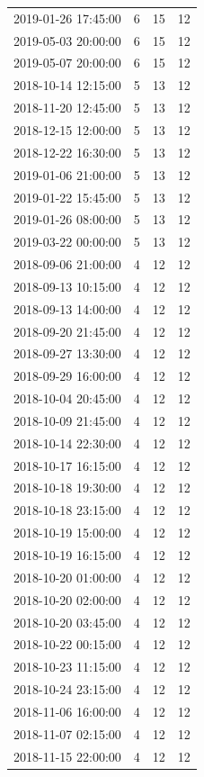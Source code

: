 \begin{tabular}{lrrr}
2019-01-26 17:45:00 & 6 & 15 & 12 \\
2019-05-03 20:00:00 & 6 & 15 & 12 \\
2019-05-07 20:00:00 & 6 & 15 & 12 \\
2018-10-14 12:15:00 & 5 & 13 & 12 \\
2018-11-20 12:45:00 & 5 & 13 & 12 \\
2018-12-15 12:00:00 & 5 & 13 & 12 \\
2018-12-22 16:30:00 & 5 & 13 & 12 \\
2019-01-06 21:00:00 & 5 & 13 & 12 \\
2019-01-22 15:45:00 & 5 & 13 & 12 \\
2019-01-26 08:00:00 & 5 & 13 & 12 \\
2019-03-22 00:00:00 & 5 & 13 & 12 \\
2018-09-06 21:00:00 & 4 & 12 & 12 \\
2018-09-13 10:15:00 & 4 & 12 & 12 \\
2018-09-13 14:00:00 & 4 & 12 & 12 \\
2018-09-20 21:45:00 & 4 & 12 & 12 \\
2018-09-27 13:30:00 & 4 & 12 & 12 \\
2018-09-29 16:00:00 & 4 & 12 & 12 \\
2018-10-04 20:45:00 & 4 & 12 & 12 \\
2018-10-09 21:45:00 & 4 & 12 & 12 \\
2018-10-14 22:30:00 & 4 & 12 & 12 \\
2018-10-17 16:15:00 & 4 & 12 & 12 \\
2018-10-18 19:30:00 & 4 & 12 & 12 \\
2018-10-18 23:15:00 & 4 & 12 & 12 \\
2018-10-19 15:00:00 & 4 & 12 & 12 \\
2018-10-19 16:15:00 & 4 & 12 & 12 \\
2018-10-20 01:00:00 & 4 & 12 & 12 \\
2018-10-20 02:00:00 & 4 & 12 & 12 \\
2018-10-20 03:45:00 & 4 & 12 & 12 \\
2018-10-22 00:15:00 & 4 & 12 & 12 \\
2018-10-23 11:15:00 & 4 & 12 & 12 \\
2018-10-24 23:15:00 & 4 & 12 & 12 \\
2018-11-06 16:00:00 & 4 & 12 & 12 \\
2018-11-07 02:15:00 & 4 & 12 & 12 \\
2018-11-15 22:00:00 & 4 & 12 & 12 \\

\end{tabular}
